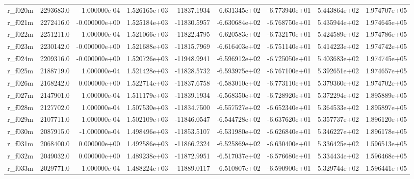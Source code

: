 \documentclass[10pt]{article}
\begin{document}
\begin{landscape}
\begin{longtable}{|l|r|r|r|r|r|r|r|r|}
r\_f020m                 &  2293683.0 & -1.000000e-04 &  1.526165e+03 & -11837.1934 & -6.631345e+02 & -6.773940e+01 &  5.443864e+02 &  1.974707e+05 \\
r\_f021m                 &  2272416.0 & -0.000000e+00 &  1.525184e+03 & -11830.5957 & -6.630684e+02 & -6.768750e+01 &  5.435944e+02 &  1.974645e+05 \\
r\_f022m                 &  2251211.0 &  1.000000e-04 &  1.521066e+03 & -11822.4795 & -6.620583e+02 & -6.732170e+01 &  5.424589e+02 &  1.974786e+05 \\
r\_f023m                 &  2230142.0 & -0.000000e+00 &  1.521688e+03 & -11815.7969 & -6.616403e+02 & -6.751140e+01 &  5.414223e+02 &  1.974742e+05 \\
r\_f024m                 &  2209316.0 & -0.000000e+00 &  1.520726e+03 & -11948.9941 & -6.596912e+02 & -6.725050e+01 &  5.403683e+02 &  1.974745e+05 \\
r\_f025m                 &  2188719.0 &  1.000000e-04 &  1.521428e+03 & -11828.5732 & -6.593975e+02 & -6.767100e+01 &  5.392651e+02 &  1.974657e+05 \\
r\_f026m                 &  2168242.0 &  0.000000e+00 &  1.522714e+03 & -11837.6758 & -6.583010e+02 & -6.773110e+01 &  5.379360e+02 &  1.974702e+05 \\
r\_f027m                 &  2147901.0 &  1.000000e-04 &  1.511179e+03 & -11839.1934 & -6.568350e+02 & -6.728920e+01 &  5.372294e+02 &  1.895889e+05 \\
r\_f028m                 &  2127702.0 &  1.000000e-04 &  1.507530e+03 & -11834.7500 & -6.557527e+02 & -6.652340e+01 &  5.364533e+02 &  1.895897e+05 \\
r\_f029m                 &  2107711.0 &  1.000000e-04 &  1.502109e+03 & -11846.0547 & -6.544728e+02 & -6.637620e+01 &  5.357737e+02 &  1.896120e+05 \\
r\_f030m                 &  2087915.0 & -1.000000e-04 &  1.498496e+03 & -11853.5107 & -6.531980e+02 & -6.626840e+01 &  5.346227e+02 &  1.896178e+05 \\
r\_f031m                 &  2068400.0 &  0.000000e+00 &  1.492586e+03 & -11866.2324 & -6.525869e+02 & -6.630400e+01 &  5.336425e+02 &  1.596513e+05 \\
r\_f032m                 &  2049032.0 &  0.000000e+00 &  1.489238e+03 & -11872.9951 & -6.517037e+02 & -6.576680e+01 &  5.334434e+02 &  1.596468e+05 \\
r\_f033m                 &  2029771.0 &  1.000000e-04 &  1.488224e+03 & -11889.0117 & -6.510807e+02 & -6.590900e+01 &  5.329744e+02 &  1.596441e+05 \\

\end{longtable}
\end{landscape}
\end{document}
